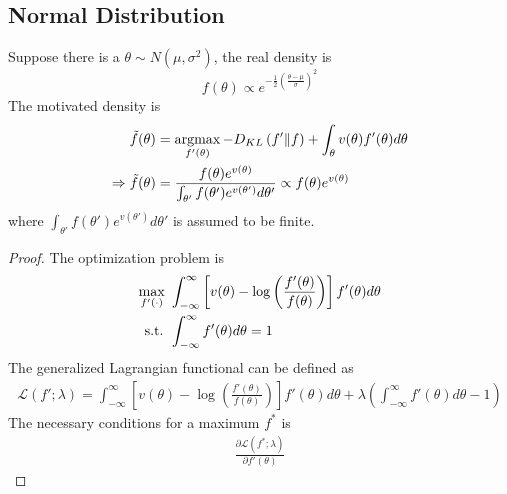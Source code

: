 \documentclass[11pt]{elegantbook}
\newcommand{\argmax}{\operatornamewithlimits{argmax}}
\begin{document}
\subsection{Normal Distribution}
Suppose there is a $\theta\sim N(\mu,\sigma^2)$, the real density is $$f(\theta)\propto e^{-\frac{1}{2}\left(\frac{\theta-\mu}{\sigma}\right)^2}$$
The motivated density is
\begin{equation}
    \begin{aligned}
        \tilde{f}(\theta)&=\argmax_{f'(\theta)}-D_{KL}\left(f'\|f\right)+\int_{\theta} v(\theta) f'(\theta) d\theta\\
        \Rightarrow \tilde{f}(\theta)&=\frac{f(\theta)e^{v(\theta)}}{\int_{\theta'} f(\theta') e^{v(\theta')}d\theta'} \propto f(\theta)e^{v(\theta)}
    \end{aligned}
    \nonumber
\end{equation}
where $\int_{\theta'} f(\theta') e^{v(\theta')}d\theta'$ is assumed to be finite.
\begin{proof}
    The optimization problem is
    \begin{equation}
        \begin{aligned}
            \max_{f'(\cdot)}\ & \int_{-\infty}^\infty \left[v(\theta)-\log\left(\frac{f'(\theta)}{f(\theta)}\right)\right] f'(\theta) d\theta\\
            \textnormal{ s.t. }& \int_{-\infty}^\infty f'(\theta) d\theta = 1
        \end{aligned}
        \nonumber
    \end{equation}
    The generalized Lagrangian functional can be defined as
    \begin{equation}
        \begin{aligned}
            \mathcal{L}(f';\lambda)=\int_{-\infty}^\infty \left[v(\theta)-\log\left(\frac{f'(\theta)}{f(\theta)}\right)\right] f'(\theta) d\theta+\lambda\left(\int_{-\infty}^\infty f'(\theta) d\theta - 1\right)
        \end{aligned}
        \nonumber
    \end{equation}
    The necessary conditions for a maximum $f^*$ is
    \begin{equation}
        \begin{aligned}
            \frac{\partial \mathcal{L}(f^*;\lambda)}{\partial f'(\theta)}
        \end{aligned}
        \nonumber
    \end{equation}
\end{proof}
\end{document}
